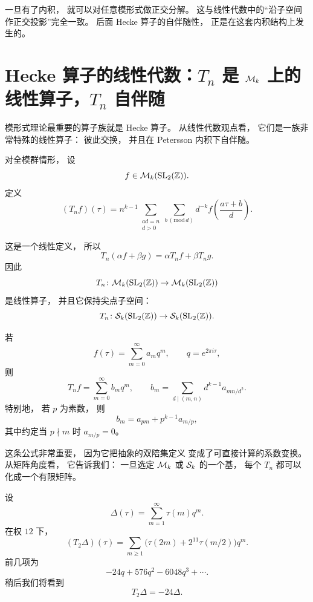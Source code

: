 \begin{remark} 一旦有了内积， 就可以对任意模形式做正交分解。 这与线性代数中的“沿子空间作正交投影”完全一致。 后面 Hecke 算子的自伴随性， 正是在这套内积结构上发生的。 \end{remark}




\section{Hecke 算子的线性代数：$T_n$ 是 $\mathcal{M}_k$ 上的线性算子，$T_n$ 自伴随}




模形式理论最重要的算子族就是 Hecke 算子。 从线性代数观点看， 它们是一族非常特殊的线性算子： 彼此交换， 并且在 Petersson 内积下自伴随。




\begin{definition}[Hecke 算子] 对全模群情形， 设 \[ f\in \mathcal{M}_k(\mathrm{SL}_2(\mathbb{Z})). \] 定义 \[ (T_n f)(\tau) = n^{k-1} \sum_{\substack{ad=n\\ d>0}} \sum_{b\,(\mathrm{mod}\, d)} d^{-k} f\!\left(\frac{a\tau+b}{d}\right). \] \end{definition} 这是一个线性定义， 所以 \[ T_n(\alpha f+\beta g)=\alpha T_n f+\beta T_n g. \] 因此 \[ T_n\colon \mathcal{M}_k(\mathrm{SL}_2(\mathbb{Z}))\to \mathcal{M}_k(\mathrm{SL}_2(\mathbb{Z})) \] 是线性算子， 并且它保持尖点子空间： \[ T_n\colon \mathcal{S}_k(\mathrm{SL}_2(\mathbb{Z}))\to \mathcal{S}_k(\mathrm{SL}_2(\mathbb{Z})). \]




\begin{theorem}[$q$-展开公式] 若 \[ f(\tau)=\sum_{m=0}^\infty a_m q^m,\qquad q=e^{2\pi i\tau}, \] 则 \[ T_n f=\sum_{m=0}^\infty b_m q^m, \qquad b_m=\sum_{d\mid(m,n)} d^{k-1} a_{mn/d^2}. \] 特别地， 若 $p$ 为素数， 则 \[ b_m=a_{pm}+p^{k-1}a_{m/p}, \] 其中约定当 $p\nmid m$ 时 $a_{m/p}=0$。 \end{theorem} 这条公式非常重要， 因为它把抽象的双陪集定义 变成了可直接计算的系数变换。 从矩阵角度看， 它告诉我们： 一旦选定 $\mathcal{M}_k$ 或 $\mathcal{S}_k$ 的一个基， 每个 $T_n$ 都可以化成一个有限矩阵。




\begin{example} 设 \[ \Delta(\tau)=\sum_{m=1}^\infty \tau(m)q^m. \] 在权 $12$ 下， \[ (T_2\Delta)(\tau)=\sum_{m\ge1}\bigl(\tau(2m)+2^{11}\tau(m/2)\bigr)q^m. \] 前几项为 \[ -24q+576q^2-6048q^3+\cdots. \] 稍后我们将看到 \[ T_2\Delta=-24\Delta. \] \end{example}





